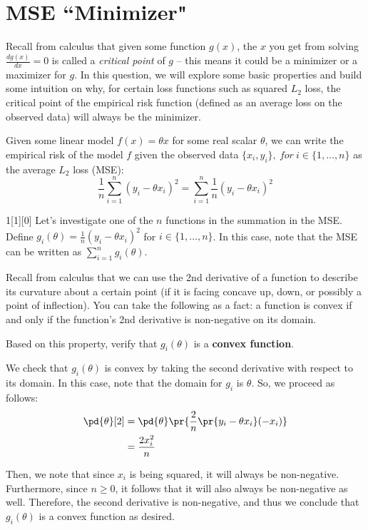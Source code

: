 \documentclass{article}
\begin{document}
\newpage

\section{MSE ``Minimizer"}
Recall from calculus that given some function $g(x)$, the $x$ you get from solving $\frac{d g(x)}{dx} = 0$ is called a \textit{critical point}
of $g$ -- this means it could be a minimizer or a maximizer for $g$. In this question, we will explore some basic properties and 
build some intuition on why, for certain loss functions such as squared $L_2$ loss, the critical point of the empirical risk function (defined as an average loss on the observed data) will always be the minimizer.

Given some linear model $f(x) = \theta x$ for some real scalar $\theta$, we can write the empirical risk of the model $f$ given the observed data $\{x_i, y_i\}, \ for \ i\in \{ 1, \dots, n\}$ as the average $L_2$ loss (MSE):
\begin{equation*}
	\frac{1}{n}\sum_{i=1}^n (y_i - \theta x_i)^2 = \sum_{i=1}^n \frac{1}{n}(y_i - \theta x_i)^2
\end{equation*}
\begin{dshw}{1}[1][0]
	Let's investigate one of the $n$ functions in the summation in the MSE. 
	Define $g_i(\theta) = \frac{1}{n}(y_i - \theta x_i)^2$ for $i \in \{1, \dots, n\}$. In this case, note that the MSE can be written as $\sum_{i=1}^{n} g_i(\theta)$.
	
	Recall from calculus that we can use the 2nd derivative of a function to describe its curvature about a certain point (if it is facing concave up, down, or possibly a point of inflection). 
	You can take the following as a fact: a function is convex if and only if the function's 2nd derivative is non-negative on its domain.
	
	Based on this property, verify that $g_i(\theta)$ is a \textbf{convex function}.
\end{dshw}
\begin{solution}
	We check that $g_{i}(\theta)$ is convex by taking the second derivative with respect to its domain. In this case, note that the domain for $g_{i}$ is $\theta$. So, we proceed as follows:
	\begin{align*}
		\pd{\theta}[2] &= \pd{\theta}\pr{\frac{2}{n} \pr{y_{i} - \theta x_{i}}(-x_{i})} \\
		&= \frac{2x_{i}^{2}}{n}
	\end{align*}

	Then, we note that since $x_{i}$ is being squared, it will always be non-negative. Furthermore, since $n \geq 0$, it follows that it will also always be non-negative as well. Therefore, the second derivative is non-negative, and thus we conclude that $g_{i}(\theta)$ is a convex function as desired.
\end{solution}
\end{document}
